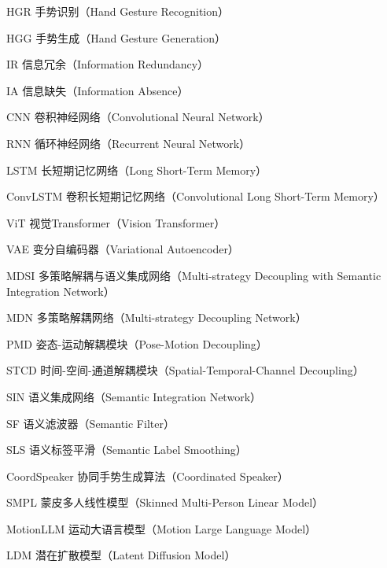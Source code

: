 
\begin{denotation}[3cm]
  \item[HGR] 手势识别（Hand Gesture Recognition）
  \item[HGG] 手势生成（Hand Gesture Generation）
  \item[IR] 信息冗余（Information Redundancy）
  \item[IA] 信息缺失（Information Absence）
  \item[CNN] 卷积神经网络（Convolutional Neural Network）
  \item[RNN] 循环神经网络（Recurrent Neural Network）
  \item[LSTM] 长短期记忆网络（Long Short-Term Memory）
  \item[ConvLSTM] 卷积长短期记忆网络（Convolutional Long Short-Term Memory）
  \item[ViT] 视觉Transformer（Vision Transformer）
  \item[VAE] 变分自编码器（Variational Autoencoder）
  \item[MDSI] 多策略解耦与语义集成网络（Multi-strategy Decoupling with Semantic Integration Network）
  \item[MDN] 多策略解耦网络（Multi-strategy Decoupling Network）
  \item[PMD] 姿态-运动解耦模块（Pose-Motion Decoupling）
  \item[STCD] 时间-空间-通道解耦模块（Spatial-Temporal-Channel Decoupling）
  \item[SIN] 语义集成网络（Semantic Integration Network）
  \item[SF] 语义滤波器（Semantic Filter）
  \item[SLS] 语义标签平滑（Semantic Label Smoothing）
  \item[CoordSpeaker] 协同手势生成算法（Coordinated Speaker）
  \item[SMPL] 蒙皮多人线性模型（Skinned Multi-Person Linear Model）
  \item[MotionLLM] 运动大语言模型（Motion Large Language Model）
  \item[LDM] 潜在扩散模型（Latent Diffusion Model）
  

\end{denotation}
